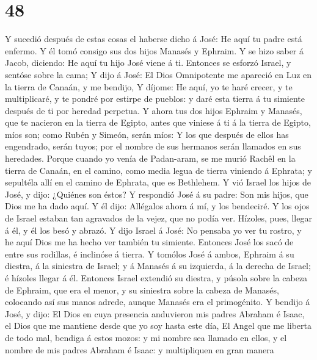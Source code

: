 \hypertarget{section-47}{%
\section{48}\label{section-47}}

 Y sucedió después de estas cosas el haberse dicho á José:
He aquí tu padre está enfermo. Y él tomó consigo sus dos hijos Manasés y
Ephraim.  Y se hizo saber á Jacob, diciendo: He aquí tu
hijo José viene á ti. Entonces se esforzó Israel, y sentóse sobre la
cama;  Y dijo á José: El Dios Omnipotente me apareció en
Luz en la tierra de Canaán, y me bendijo,  Y díjome: He
aquí, yo te haré crecer, y te multiplicaré, y te pondré por estirpe de
pueblos: y daré esta tierra á tu simiente después de ti por heredad
perpetua.  Y ahora tus dos hijos Ephraim y Manasés, que te
nacieron en la tierra de Egipto, antes que viniese á ti á la tierra de
Egipto, míos son; como Rubén y Simeón, serán míos:  Y los
que después de ellos has engendrado, serán tuyos; por el nombre de sus
hermanos serán llamados en sus heredades.  Porque cuando
yo venía de Padan-aram, se me murió Rachêl en la tierra de Canaán, en el
camino, como media legua de tierra viniendo á Ephrata; y sepultéla allí
en el camino de Ephrata, que es Bethlehem.  Y vió Israel
los hijos de José, y dijo: ¿Quiénes son éstos?  Y
respondió José á su padre: Son mis hijos, que Dios me ha dado aquí. Y él
dijo: Allégalos ahora á mí, y los bendeciré.  Y los ojos
de Israel estaban tan agravados de la vejez, que no podía ver. Hízoles,
pues, llegar á él, y él los besó y abrazó.  Y dijo Israel
á José: No pensaba yo ver tu rostro, y he aquí Dios me ha hecho ver
también tu simiente.  Entonces José los sacó de entre sus
rodillas, é inclinóse á tierra.  Y tomólos José á ambos,
Ephraim á su diestra, á la siniestra de Israel; y á Manasés á su
izquierda, á la derecha de Israel; é hízoles llegar á él.
 Entonces Israel extendió su diestra, y púsola sobre la
cabeza de Ephraim, que era el menor, y su siniestra sobre la cabeza de
Manasés, colocando así sus manos adrede, aunque Manasés era el
primogénito.  Y bendijo á José, y dijo: El Dios en cuya
presencia anduvieron mis padres Abraham é Isaac, el Dios que me mantiene
desde que yo soy hasta este día,  El Angel que me liberta
de todo mal, bendiga á estos mozos: y mi nombre sea llamado en ellos, y
el nombre de mis padres Abraham é Isaac: y multipliquen en gran manera
